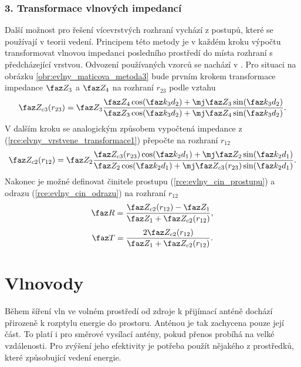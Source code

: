 \subsubsection*{3. Transformace vlnových impedancí}
Další možnost pro řešení vícevrstvých rozhraní vychází z postupů, které se používají v teorii vedení. Principem této metody je v každém kroku výpočtu transformovat vlnovou impedanci posledního prostředí do místa rozhraní s předcházející vrstvou. 
Odvození používaných vzorců se nachází v \cite[str. 106]{emp}.
Pro situaci na obrázku \ref{obr:evlny_maticova_metoda3} bude prvním krokem transformace impedance $\faz Z_{3}$ a $\faz Z_{4}$ na rozhraní $r_{23}$ podle vztahu
\begin{equation}
	\faz Z_{c3}(r_{23}) = \faz Z_{3}\frac{\faz Z_{4}\cos(\faz k_{3}d_{2})+\mj\faz Z_{3}\sin(\faz k_{3}d_{2})}{\faz Z_{3}\cos(\faz k_{3}d_{2})+\mj\faz Z_{4}\sin(\faz k_{3}d_{2})}.
	\label{rce:elvny_vrstvene_transformace1}
\end{equation}
V dalším kroku se analogickým způsobem vypočtená impedance z (\ref{rce:elvny_vrstvene_transformace1}) přepočte na rozhraní $r_{12}$
\begin{equation}
	\faz Z_{c2}(r_{12}) = \faz Z_{2}\frac{\faz Z_{c3}(r_{23})\cos(\faz k_{2}d_{1})+\mj\faz Z_{2}\sin(\faz k_{2}d_{1})}{\faz Z_{2}\cos(\faz k_{2}d_{1})+\mj\faz Z_{c3}(r_{23})\sin(\faz k_{2}d_{1})}.
	\label{rce:elvny_vrstvene_transformace2}
\end{equation}
Nakonec je možné definovat činitele prostupu (\ref{rce:evlny_cin_prostupu}) a odrazu (\ref{rce:evlny_cin_odrazu}) na rozhraní $r_{12}$
\begin{equation}
	\faz R = \frac{\faz Z_{c2}(r_{12}) - \faz Z_{1}}{\faz Z_{1} + \faz Z_{c2}(r_{12})}
	\label{rce:elvny_vrstvene_transf_R},
\end{equation}
\begin{equation}
	\faz T = \frac{2\faz Z_{c2}(r_{12})}{\faz Z_{1} + \faz Z_{c2}(r_{12})}
	\label{rce:elvny_vrstvene_transf_T}.
\end{equation}
\newpage

\section{Vlnovody}
Během šíření vln ve volném prostředí od zdroje k přijímací anténě dochází přirozeně k rozptylu energie do prostoru. Anténou je tak zachycena pouze její část. To platí i pro směrové vysílací antény, pokud přenos probíhá na velké vzdálenosti. Pro zvýšení jeho efektivity je potřeba použít nějakého z prostředků, které způsobující vedení energie. 

